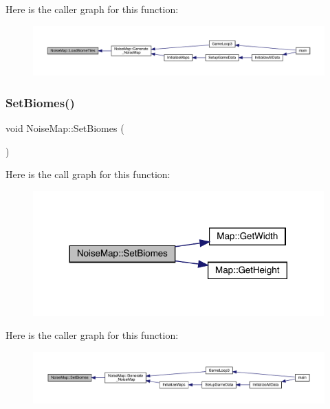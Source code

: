 Here is the caller graph for this function\+:
\nopagebreak
\begin{figure}[H]
\begin{center}
\leavevmode
\includegraphics[width=350pt]{d1/dd4/class_noise_map_ad8e07b9a0fc70191c781f1cdfef66b54_icgraph}
\end{center}
\end{figure}
\mbox{\label{class_noise_map_a12446f47eb5f29d25f7538ebaf0713a4}} 
\subsubsection{\texorpdfstring{Set\+Biomes()}{SetBiomes()}}
{\footnotesize\ttfamily void Noise\+Map\+::\+Set\+Biomes (\begin{DoxyParamCaption}{ }\end{DoxyParamCaption})}

Here is the call graph for this function\+:
\nopagebreak
\begin{figure}[H]
\begin{center}
\leavevmode
\includegraphics[width=317pt]{d1/dd4/class_noise_map_a12446f47eb5f29d25f7538ebaf0713a4_cgraph}
\end{center}
\end{figure}
Here is the caller graph for this function\+:
\nopagebreak
\begin{figure}[H]
\begin{center}
\leavevmode
\includegraphics[width=350pt]{d1/dd4/class_noise_map_a12446f47eb5f29d25f7538ebaf0713a4_icgraph}
\end{center}
\end{figure}


